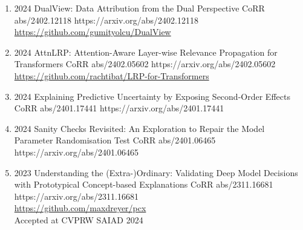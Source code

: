{\begin{enumerate}
        \item {}
                        {2024}
                        {DualView: Data Attribution from the Dual Perspective}
                        {CoRR abs/2402.12118}
                        {https://arxiv.org/abs/2402.12118}
                        {\\\href{https://github.com/gumityolcu/DualView}{https://github.com/gumityolcu/DualView}}

        \item {}
                        {2024}
                        {AttnLRP: Attention-Aware Layer-wise Relevance Propagation for Transformers}
                        {CoRR abs/2402.05602}
                        {https://arxiv.org/abs/2402.05602}
                        {\\\href{https://github.com/rachtibat/LRP-for-Transformers}{https://github.com/rachtibat/LRP-for-Transformers}}


        \item {}
                        {2024}
                        {Explaining Predictive Uncertainty by Exposing Second-Order Effects}
                        {CoRR abs/2401.17441}
                        {https://arxiv.org/abs/2401.17441}

        \item {}
                        {2024}
                        {Sanity Checks Revisited: An Exploration to Repair the Model Parameter Randomisation Test}
                        {CoRR abs/2401.06465}
                        {https://arxiv.org/abs/2401.06465}

        \item {}
                        {2023}
                        {Understanding the (Extra-)Ordinary: Validating Deep Model Decisions with
                        Prototypical Concept-based Explanations}
                        {CoRR abs/2311.16681}
                        {https://arxiv.org/abs/2311.16681}
                        {\\\href{https://github.com/maxdreyer/pcx}{https://github.com/maxdreyer/pcx}\\
                        Accepted at CVPRW SAIAD 2024}


\end{enumerate}}
